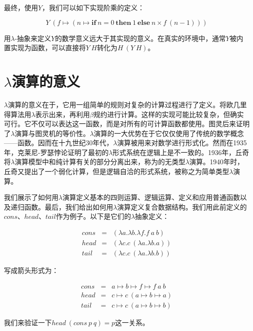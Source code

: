 \documentclass[UTF8]{article}
\begin{document}
最终，使用$Y$，我们可以如下实现阶乘的定义：

\[
Y\ (f \mapsto (n \mapsto \textbf{if}\ n = 0\ \textbf{then}\ 1\ \textbf{else}\ n \times f\ (n - 1)))
\]

用$\lambda$-抽象来定义$Y$的数学意义远大于其实现的意义。在真实的环境中，通常$Y$被内置实现为函数，可以直接将$Y\ H$转化为$H\ (Y\ H)$。

\section{$\lambda$演算的意义}

$\lambda$演算的意义在于，它用一组简单的规则对复杂的计算过程进行了定义。将欧几里得算法用$\lambda$表示出来，再利用$\beta$规约进行计算。这样的实现可能比较复杂，但确实可行。它不仅可以表达这一函数，而是对所有的可计算函数都使用。图灵后来证明了$\lambda$演算与图灵机的等价性。$\lambda$演算的一大优势在于它仅仅使用了传统的数学概念——函数。因而在十九世纪30年代，$\lambda$演算被用来对数学进行形式化。然而在1935年，克莱尼-罗瑟悖论证明了最初的$\lambda$形式系统在逻辑上是不一致的。1936年，丘奇将$\lambda$演算模型中和纯计算有关的部分分离出来，称为的无类型$\lambda$演算。1940年时，丘奇又提出了一个弱化计算，但是逻辑自洽的形式系统，被称之为简单类型$\lambda$演算。

我们展示了如何用$\lambda$演算定义基本的四则运算、逻辑运算、定义和应用普通函数以及递归函数。最后，我们给出如何用$\lambda$演算定义复合数据结构。我们用此前定义的$cons$、$head$、$tail$作为例子。以下是它们的$\lambda$抽象定义：

\[
\begin{array}{rcl}
cons & = & (\lambda a . \lambda b . \lambda f . f\ a\ b) \\
head & = & (\lambda c . c\ (\lambda a . \lambda b . a)) \\
tail & = & (\lambda c . c\ (\lambda a . \lambda b . b))
\end{array}
\]

写成箭头形式为：

\[
\begin{array}{rcl}
cons & = & a \mapsto b \mapsto f \mapsto f\ a\ b \\
head & = & c \mapsto c\ (a \mapsto b \mapsto a) \\
tail & = & c \mapsto c\ (a \mapsto b \mapsto b)
\end{array}
\]

我们来验证一下$head\ (cons\ p\ q) = p$这一关系。
\end{document}
